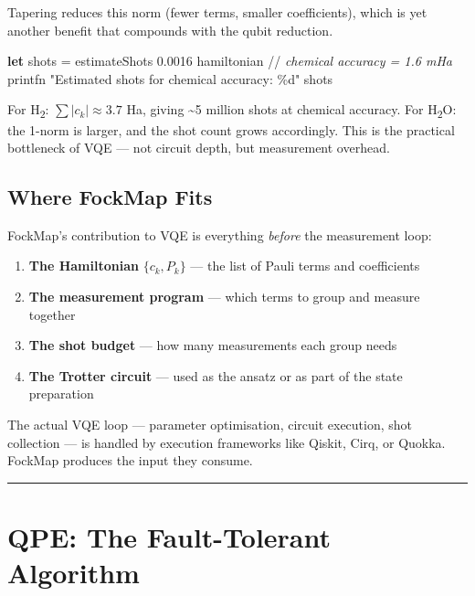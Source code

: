 \documentclass[
  11pt,
  oneside]{book}
\newenvironment{Shaded}{\begin{snugshade}}{\end{snugshade}}
\newcommand{\CommentTok}[1]{\textcolor[rgb]{0.56,0.35,0.01}{\textit{#1}}}
\newcommand{\FloatTok}[1]{\textcolor[rgb]{0.00,0.00,0.81}{#1}}
\newcommand{\KeywordTok}[1]{\textcolor[rgb]{0.13,0.29,0.53}{\textbf{#1}}}
\newcommand{\NormalTok}[1]{#1}
\newcommand{\StringTok}[1]{\textcolor[rgb]{0.31,0.60,0.02}{#1}}
\providecommand{\tightlist}{%
  \setlength{\itemsep}{0pt}\setlength{\parskip}{0pt}}
\begin{document}
Tapering reduces this norm (fewer terms, smaller coefficients), which is
yet another benefit that compounds with the qubit reduction.

\begin{Shaded}
\begin{Highlighting}[]
\KeywordTok{let}\NormalTok{ shots = estimateShots }\FloatTok{0.0016}\NormalTok{ hamiltonian  //}\CommentTok{ chemical accuracy = 1.6 mHa}
\NormalTok{printfn }\StringTok{"Estimated shots for chemical accuracy: \%d"}\NormalTok{ shots}
\end{Highlighting}
\end{Shaded}

For H\textsubscript{2}: \(\sum|c_k| \approx 3.7\) Ha, giving \textasciitilde5 million
shots at chemical accuracy. For H\textsubscript{2}O: the 1-norm is larger, and the shot
count grows accordingly. This is the practical bottleneck of VQE --- not
circuit depth, but measurement overhead.

\subsection{Where FockMap Fits}\label{where-fockmap-fits}

FockMap's contribution to VQE is everything \emph{before} the
measurement loop:

\begin{enumerate}
\def\labelenumi{\arabic{enumi}.}
\tightlist
\item
  \textbf{The Hamiltonian} \(\{c_k, P_k\}\) --- the list of Pauli terms
  and coefficients
\item
  \textbf{The measurement program} --- which terms to group and measure
  together
\item
  \textbf{The shot budget} --- how many measurements each group needs
\item
  \textbf{The Trotter circuit} --- used as the ansatz or as part of the
  state preparation
\end{enumerate}

The actual VQE loop --- parameter optimisation, circuit execution, shot
collection --- is handled by execution frameworks like Qiskit, Cirq, or
Quokka. FockMap produces the input they consume.

\begin{center}\rule{0.5\linewidth}{0.5pt}\end{center}

\section{QPE: The Fault-Tolerant
Algorithm}\label{qpe-the-fault-tolerant-algorithm}
\end{document}
